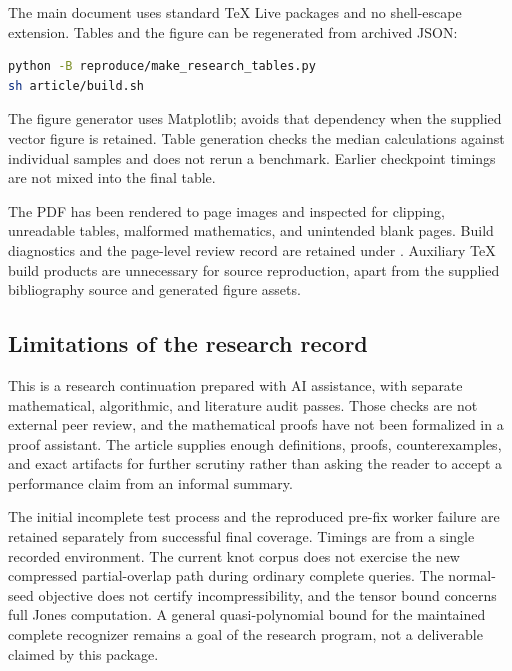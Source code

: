 The main document uses standard TeX Live packages and no shell-escape
extension. Tables and the figure can be regenerated from archived JSON:
\par\noindent\begin{minipage}{\linewidth}
\begin{lstlisting}[language=bash]
python -B reproduce/make_research_tables.py
sh article/build.sh
\end{lstlisting}
\end{minipage}\par

The figure generator uses Matplotlib;  avoids that
dependency when the supplied vector figure is retained. Table generation
checks the median calculations against individual samples and does not
rerun a benchmark. Earlier checkpoint timings are not mixed into the final
table.

The PDF has been rendered to page images and inspected for clipping,
unreadable tables, malformed mathematics, and unintended blank pages.
Build diagnostics and the page-level review record are retained under
. Auxiliary TeX build products are unnecessary for source
reproduction, apart from the supplied bibliography source and generated
figure assets.

\subsection{Limitations of the research record}

This is a research continuation prepared with AI assistance, with separate
mathematical, algorithmic, and literature audit passes. Those checks are not
external peer review, and the mathematical proofs have not been formalized
in a proof assistant. The article supplies enough definitions, proofs,
counterexamples, and exact artifacts for further scrutiny rather than asking
the reader to accept a performance claim from an informal summary.

The initial incomplete test process and the reproduced pre-fix worker failure
are retained separately from successful final coverage. Timings are from a
single recorded environment. The current knot corpus does not exercise the
new compressed partial-overlap path during ordinary complete queries.
The normal-seed objective does not certify incompressibility, and the tensor
bound concerns full Jones computation. A general quasi-polynomial bound
for the maintained complete recognizer remains a goal of the research
program, not a deliverable claimed by this package.
